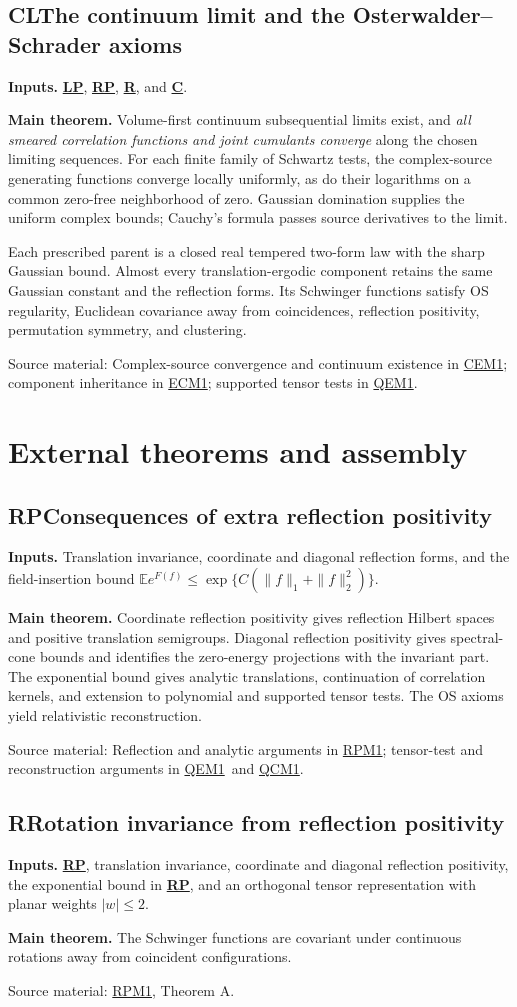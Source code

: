 \documentclass[11pt]{article}
\newcommand{\Code}[1]{\hyperlink{block-#1}{\textbf{#1}}}
\newcommand{\Block}[2]{\hypertarget{block-#1}{}%
 \subsection*{\textcolor{flowgreen}{#1}\quad #2}}
\newcommand{\ExternalBlock}[2]{\hypertarget{block-#1}{}%
 \subsection*{\textcolor{manuscriptblue}{#1}\quad #2}}
\newcommand{\Inputs}[1]{\textbf{Inputs.} #1\par}
\newcommand{\Theorem}[1]{\textbf{Main theorem.} #1\par}
\newcommand{\Sources}[1]{\par{\small\textcolor{flowgray}{Source material:} #1\par}}
\newcommand{\Repo}{https://github.com/ethanwsussman/Yang--Mills-LLM-experiment}
\newcommand{\Old}[2]{\href{\Repo/#1}{#2}}
\newcommand{\CEsource}{\Old{tree/main/QED3/OLD/Submanuscripts/Continuum\%20existence\%20\%28CE1\%29}{CEM1}}
\newcommand{\ECsource}{\Old{tree/main/QED3/OLD/Submanuscripts/Continuum\%20components\%20and\%20clustering\%20\%28EC1\%29}{ECM1}}
\newcommand{\RPsource}{\Old{blob/main/RP\%20O\%28d\%29\%20trick\%20\%28RP1\%29/RPM1.tex}{RPM1}}
\newcommand{\QCsource}{\Old{blob/main/QED3/QED3_supplement.tex}{QCM1}}
\newcommand{\QEsource}{\Old{blob/main/QED3/OLD/QEM1.tex}{QEM1}}
\begin{document}
\Block{CL}{The continuum limit and the Osterwalder--Schrader axioms}
\Inputs{\Code{LP}, \Code{RP}, \Code{R}, and \Code{C}.}
\Theorem{Volume-first continuum subsequential limits exist, and
\emph{all smeared correlation functions and joint cumulants converge}
along the chosen limiting sequences. For each finite family of Schwartz tests,
the complex-source generating functions converge locally uniformly,
as do their logarithms on a common zero-free neighborhood of zero.
Gaussian domination supplies the
uniform complex bounds; Cauchy's formula passes source derivatives
to the limit.

Each prescribed parent is a closed real tempered two-form law with
the sharp Gaussian bound. Almost every translation-ergodic
component retains the same Gaussian constant and the reflection forms.
Its Schwinger functions satisfy OS regularity, Euclidean covariance away
from coincidences, reflection positivity, permutation symmetry, and
clustering.}
\Sources{Complex-source convergence and continuum existence in \CEsource;
component inheritance in \ECsource;
supported tensor tests in \QEsource.}

\clearpage
\section*{External theorems and assembly}

\ExternalBlock{RP}{Consequences of extra reflection positivity}
\Inputs{Translation invariance, coordinate and diagonal reflection
forms, and the field-insertion bound
\(\mathbb E e^{F(f)}\le\exp\{C(\|f\|_1+\|f\|_2^2)\}\).}
\Theorem{Coordinate reflection positivity gives reflection Hilbert
spaces and positive translation semigroups. Diagonal reflection
positivity gives spectral-cone bounds and identifies the zero-energy
projections with the invariant part. The exponential bound gives
analytic translations, continuation of correlation kernels, and
extension to polynomial and supported tensor tests.
The OS axioms yield relativistic reconstruction.}
\Sources{Reflection and analytic arguments in \RPsource;
tensor-test and reconstruction arguments in \QEsource\ and \QCsource.}

\ExternalBlock{R}{Rotation invariance from reflection positivity}
\Inputs{\Code{RP}, translation invariance, coordinate and diagonal
reflection positivity, the exponential bound in \Code{RP}, and an orthogonal
tensor representation with planar weights \(\lvert w\rvert\le2\).}
\Theorem{The Schwinger functions are covariant under continuous
rotations away from coincident configurations.}
\Sources{\RPsource, Theorem A.}
\end{document}
